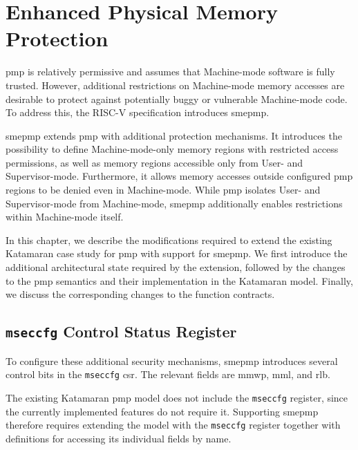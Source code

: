 \glsresetall

\chapter{Enhanced Physical Memory Protection}
\Gls{pmp} is relatively permissive and assumes that Machine-mode software is fully trusted. 
However, additional restrictions on Machine-mode memory accesses are desirable to protect against potentially buggy or vulnerable Machine-mode code.
To address this, the RISC-V specification introduces \gls{smepmp}.

\Gls{smepmp} extends \gls{pmp} with additional protection mechanisms.
It introduces the possibility to define Machine-mode-only memory regions with restricted access permissions, as well as memory regions accessible only from User- and Supervisor-mode.
Furthermore, it allows memory accesses outside configured \gls{pmp} regions to be denied even in Machine-mode.
While \gls{pmp} isolates User- and Supervisor-mode from Machine-mode, \gls{smepmp} additionally enables restrictions within Machine-mode itself.~\cite{smePMP_apendix}

In this chapter, we describe the modifications required to extend the existing Katamaran case study for \gls{pmp} with support for \gls{smepmp}.
We first introduce the additional architectural state required by the extension, followed by the changes to the \gls{pmp} semantics and their implementation in the Katamaran model.
Finally, we discuss the corresponding changes to the function contracts.

\section{\texttt{mseccfg} Control Status Register}
To configure these additional security mechanisms, \gls{smepmp} introduces several control bits in the \texttt{mseccfg} \gls{csr}.
The relevant fields are \gls{mmwp}, \gls{mml}, and \gls{rlb}. 

The existing Katamaran \gls{pmp} model does not include the \texttt{mseccfg} register, since the currently implemented features do not require it.
Supporting \gls{smepmp} therefore requires extending the model with the \texttt{mseccfg} register together with definitions for accessing its individual fields by name.

